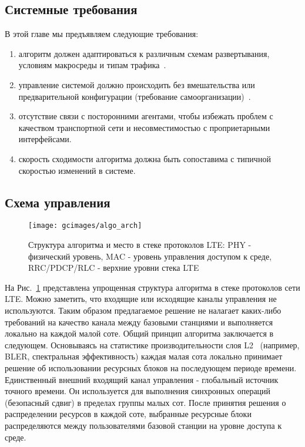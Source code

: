 \subsection{Системные требования}
В этой главе мы предъявляем следующие требования:
\begin{enumerate}
\item алгоритм должен адаптироваться к различным схемам развертывания, условиям макросреды и типам трафика~\cite{TS36.300}.
\item управление системой должно происходить без вмешательства или предварительной конфигурации (требование самоорганизации)~\cite{TS36.902}.
\item отсутствие связи с посторонними агентами, чтобы избежать проблем с качеством транспортной сети и несовместимостью с проприетарными интерфейсами.
\item скорость сходимости алгоритма должна быть сопоставима с типичной скоростью изменений в системе.
\end{enumerate}

\subsection{Схема управления}
\begin{figure}[h]
    \centering
    \texttt{[image: gcimages/algo\_arch]}
    \caption{Структура алгоритма и место в стеке протоколов LTE: PHY - физический уровень, MAC - уровень управления доступом к среде, RRC/PDCP/RLC - верхние уровни стека LTE}
    \label{fig:algo_arch}
\end{figure}

На Рис.~\ref{fig:algo_arch} представлена упрощенная структура алгоритма в стеке протоколов сети LTE. Можно заметить, что входящие или исходящие каналы управления не используются. Таким образом предлагаемое решение не налагает каких-либо требований на качество канала между базовыми станциями и выполняется локально на каждой малой соте.
Общий принцип алгоритма заключается в следующем. Основываясь на статистике производительности слоя L2~\cite{TS36.300} (например, BLER, спектральная эффективность) каждая малая сота локально принимает решение об использовании ресурсных блоков на последующем периоде времени. Единственный внешний входящий канал управления - глобальный источник точного времени. Он используется для выполнения синхронных операций (безопасный сдвиг) в пределах группы малых сот. После принятия решения о распределении ресурсов в каждой соте, выбранные ресурсные блоки  распределяются между пользователями базовой станции на уровне доступа к среде.

